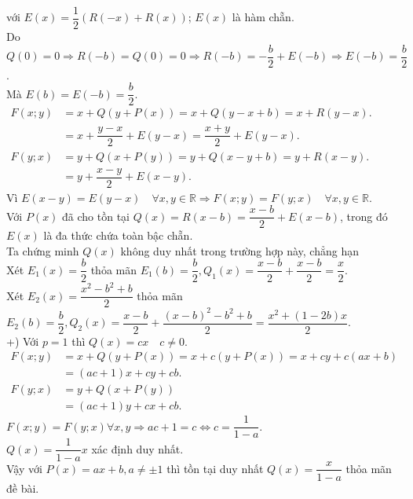 \begin{bt}
{		với $E(x)=\dfrac{1}{2}(R(-x)+R(x))$; $E(x)$ là hàm chẵn.\\
		Do $Q(0)=0\Rightarrow R(-b)=Q(0)=0 \Rightarrow R(-b)=-\dfrac{b}{2}+E(-b)\Rightarrow E(-b)=\dfrac{b}{2}$.\\
		Mà $E(b)=E(-b)=\dfrac{b}{2}$.\\
		$\begin{array}{ll}
				F(x;y)&=x+Q(y+P(x))=x+Q(y-x+b)=x+R(y-x).\\
				&=x+\dfrac{y-x}{2}+E(y-x)=\dfrac{x+y}{2}+E(y-x).
		\end{array}$\\
		$\begin{array}{ll}
			F(y;x)&=y+Q(x+P(y))=y+Q(x-y+b)=y+R(x-y).\\
			&=y+\dfrac{x-y}{2}+E(x-y).
		\end{array}$\\
		Vì $E(x-y)=E(y-x) \quad \forall x, y\in \mathbb{R}\Rightarrow F(x;y)=F(y;x) \quad \forall x, y\in \mathbb{R}$. \\
		Với $P(x)$ đã cho tồn tại $Q(x)=R(x-b)=\dfrac{x-b}{2}+E(x-b)$, trong đó $E(x)$ là đa thức chứa toàn bậc chẵn.\\
		Ta chứng minh $Q(x)$ không duy nhất trong trường hợp này, chẳng hạn \\
		Xét $E_1(x)=\dfrac{b}{2}$ thỏa mãn $E_1(b)=\dfrac{b}{2}, Q_1(x)=\dfrac{x-b}{2}+\dfrac{x-b}{2}=\dfrac{x}{2}$.\\
		Xét $E_2(x)=\dfrac{x^2-b^2+b}{2}$ thỏa mãn $E_2(b)=\dfrac{b}{2}, Q_2(x)=\dfrac{x-b}{2}+\dfrac{(x-b)^2-b^2+b}{2}=\dfrac{x^2+(1-2b)x}{2}$.\\
		+) Với $p=1$ thì $Q(x)=cx \quad c\neq 0$.\\
		$\begin{array}{ll}
		F(x;y)&=x+Q(y+P(x))=x+c(y+P(x))=x+cy+c(ax+b)\\
		&=(ac+1)x+cy+cb.
		\end{array}$\\
		$\begin{array}{ll}
		F(y;x)&=y+Q(x+P(y))\\
		&=(ac+1)y+cx+cb.
		\end{array}$\\
		$F(x;y)=F(y;x) \forall x, y \Rightarrow ac+1=c\Leftrightarrow c=\dfrac{1}{1-a}$.\\
		$Q(x)=\dfrac{1}{1-a}x$ xác định duy nhất.\\
		Vậy với $P(x)=ax+b, a\neq \pm 1$ thì tồn tại duy nhất $Q(x)=\dfrac{x}{1-a}$ thỏa mãn đề bài.	
}
\end{bt}
	
